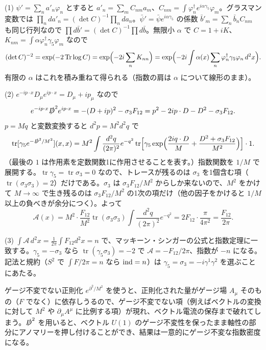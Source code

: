 \begin{solution}
(1) $\psi'=\sum_na'_n\varphi_n$ とすると $a'_n=\sum_mC_{nm}a_m$、$C_{nm}=\int\varphi_n^\dagger e^{i\alpha\gamma_5}\varphi_m$。グラスマン変数では $\prod_nda'_n=(\det C)^{-1}\prod_nda_n$。$\bar\psi'=\bar\psi e^{i\alpha\gamma_5}$ の係数 $\bar b'_m=\sum_n\bar b_nC_{nm}$ も同じ行列なので $\prod d\bar b'=(\det C)^{-1}\prod d\bar b$。無限小 $\alpha$ で $C=1+iK$、$K_{nm}=\int\alpha\varphi_n^\dagger\gamma_5\varphi_m$ なので
\[
(\det C)^{-2}=\exp(-2\operatorname{Tr}\log C)=\exp\Bigl(-2i\sum_nK_{nn}\Bigr)=\exp\Bigl(-2i\int\alpha(x)\sum_n\varphi_n^\dagger\gamma_5\varphi_n\,d^2x\Bigr).
\]
有限の $\alpha$ はこれを積み重ねて得られる（指数の肩は $\alpha$ について線形のまま）。

(2) $e^{-ip\cdot x}D_\mu e^{ip\cdot x}=D_\mu+ip_\mu$ なので
\[
e^{-ip\cdot x}\slashed D^2e^{ip\cdot x}=-(D+ip)^2-\sigma_3F_{12}=p^2-2ip\cdot D-D^2-\sigma_3F_{12}.
\]
$p=Mq$ と変数変換すると $d^2p=M^2d^2q$ で
\[
\operatorname{tr}[\gamma_5e^{-\slashed D^2/M^2}](x,x)=M^2\int\frac{d^2q}{(2\pi)^2}e^{-q^2}\operatorname{tr}\Bigl[\gamma_5\exp\Bigl(\frac{2iq\cdot D}{M}+\frac{D^2+\sigma_3F_{12}}{M^2}\Bigr)\Bigr]\cdot1 .
\]
（最後の $1$ は作用素を定数関数1に作用させることを表す。）指数関数を $1/M$ で展開する。$\operatorname{tr}\gamma_5=\operatorname{tr}\sigma_3=0$ なので、トレースが残るのは $\sigma_3$ を1個含む項（$\operatorname{tr}(\sigma_3\sigma_3)=2$）だけである。$\sigma_3$ は $\sigma_3F_{12}/M^2$ からしか来ないので、$M^2$ をかけて $M\to\infty$ で生き残るのは $\sigma_3F_{12}/M^2$ の1次の項だけ（他の因子をかけると $1/M$ 以上の負べきが余分につく）。よって
\[
\mathcal A(x)=M^2\cdot\frac{F_{12}}{M^2}\operatorname{tr}(\sigma_3\sigma_3)\int\frac{d^2q}{(2\pi)^2}e^{-q^2}=2F_{12}\cdot\frac{\pi}{4\pi^2}=\frac{F_{12}}{2\pi}.
\]

(3) $\int\mathcal A\,d^2x=\frac1{2\pi}\int F_{12}d^2x=n$ で、マッキーン・シンガーの公式と指数定理に一致する。$\gamma_5=-\sigma_3$ なら $\operatorname{tr}(\gamma_5\sigma_3)=-2$ で $\mathcal A=-F_{12}/2\pi$、指数が $-n$ になる。記法と規約（$S^2$ で $\int F/2\pi=n$ なら $\operatorname{ind}=n$）は $\gamma_5=\sigma_3=-i\gamma^1\gamma^2$ を選ぶことにあたる。

ゲージ不変でない正則化 $e^{\partial^2/M^2}$ を使うと、正則化された量がゲージ場 $A_\mu$ そのもの（$F$ でなく）に依存しうるので、ゲージ不変でない項（例えばベクトルの変換に対して $M^2$ や $\partial_\mu A^\mu$ に比例する項）が現れ、ベクトル電流の保存まで破れてしまう。$\slashed D^2$ を用いると、ベクトル $U(1)$ のゲージ不変性を保ったまま軸性の部分にアノマリーを押し付けることができ、結果は一意的にゲージ不変な指数密度になる。
\end{solution}

